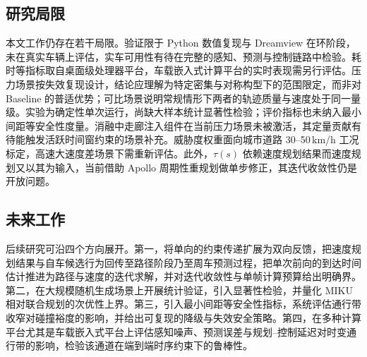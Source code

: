 \documentclass[a4paper,11pt]{ctexart}
\theoremstyle{definition}
\begin{document}
\subsection{研究局限}

本文工作仍存在若干局限。验证限于 Python 数值复现与 Dreamview 在环阶段，未在真实车辆上评估，实车可用性有待在完整的感知、预测与控制链路中检验。耗时等指标取自桌面级处理器平台，车载嵌入式计算平台的实时表现需另行评估。压力场景按失效复现设计，结论应理解为特定密集与对称构型下的范围限定，而非对 Baseline 的普适优势；可比场景说明常规情形下两者的轨迹质量与速度处于同一量级。实验为确定性单次运行，尚缺大样本统计显著性检验；评价指标也未纳入最小间距等安全性度量。消融中走廊注入组件在当前压力场景未被激活，其定量贡献有待能触发活跃时间窗约束的场景补充。威胁度权重面向城市道路 30--50\,km/h 工况标定，高速大速度差场景下需重新评估。此外，$\tau(s)$ 依赖速度规划结果而速度规划又以其为输入，当前借助 Apollo 周期性重规划做单步修正，其迭代收敛性仍是开放问题。

\subsection{未来工作}

后续研究可沿四个方向展开。第一，将单向的约束传递扩展为双向反馈，把速度规划结果与自车候选行为回传至路径阶段乃至周车预测过程，把单次前向的到达时间估计推进为路径与速度的迭代求解，并对迭代收敛性与单帧计算预算给出明确界。第二，在大规模随机生成场景上开展统计验证，引入显著性检验，并量化 MIKU 相对联合规划的次优性上界。第三，引入最小间距等安全性指标，系统评估通行带收窄对碰撞裕度的影响，并给出可复现的降级与失效安全策略。第四，在多种计算平台尤其是车载嵌入式平台上评估感知噪声、预测误差与规划--控制延迟对时变通行带的影响，检验该通道在端到端时序约束下的鲁棒性。


\printbibliography[heading=bibintoc,title={参考文献}]
\end{document}
